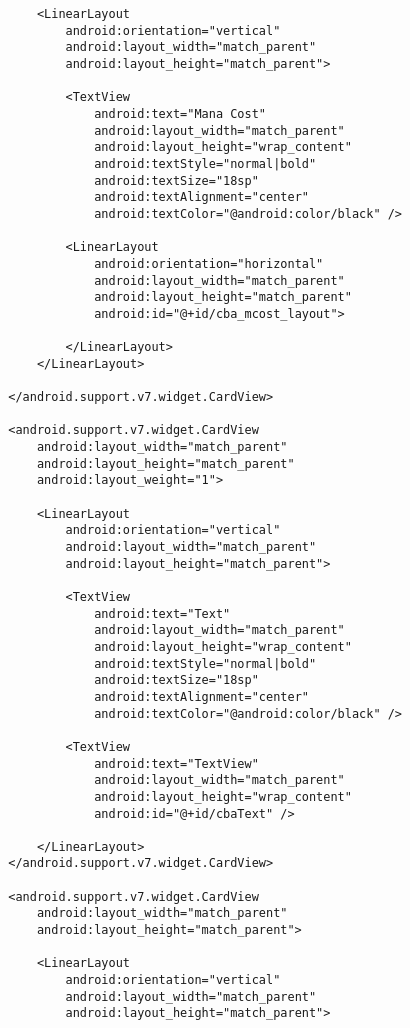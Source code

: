 \begin{lstlisting}
            <LinearLayout
                android:orientation="vertical"
                android:layout_width="match_parent"
                android:layout_height="match_parent">

                <TextView
                    android:text="Mana Cost"
                    android:layout_width="match_parent"
                    android:layout_height="wrap_content"
                    android:textStyle="normal|bold"
                    android:textSize="18sp"
                    android:textAlignment="center"
                    android:textColor="@android:color/black" />

                <LinearLayout
                    android:orientation="horizontal"
                    android:layout_width="match_parent"
                    android:layout_height="match_parent"
                    android:id="@+id/cba_mcost_layout">

                </LinearLayout>
            </LinearLayout>

        </android.support.v7.widget.CardView>

        <android.support.v7.widget.CardView
            android:layout_width="match_parent"
            android:layout_height="match_parent"
            android:layout_weight="1">

            <LinearLayout
                android:orientation="vertical"
                android:layout_width="match_parent"
                android:layout_height="match_parent">

                <TextView
                    android:text="Text"
                    android:layout_width="match_parent"
                    android:layout_height="wrap_content"
                    android:textStyle="normal|bold"
                    android:textSize="18sp"
                    android:textAlignment="center"
                    android:textColor="@android:color/black" />

                <TextView
                    android:text="TextView"
                    android:layout_width="match_parent"
                    android:layout_height="wrap_content"
                    android:id="@+id/cbaText" />

            </LinearLayout>
        </android.support.v7.widget.CardView>

        <android.support.v7.widget.CardView
            android:layout_width="match_parent"
            android:layout_height="match_parent">

            <LinearLayout
                android:orientation="vertical"
                android:layout_width="match_parent"
                android:layout_height="match_parent">


\end{lstlisting}
